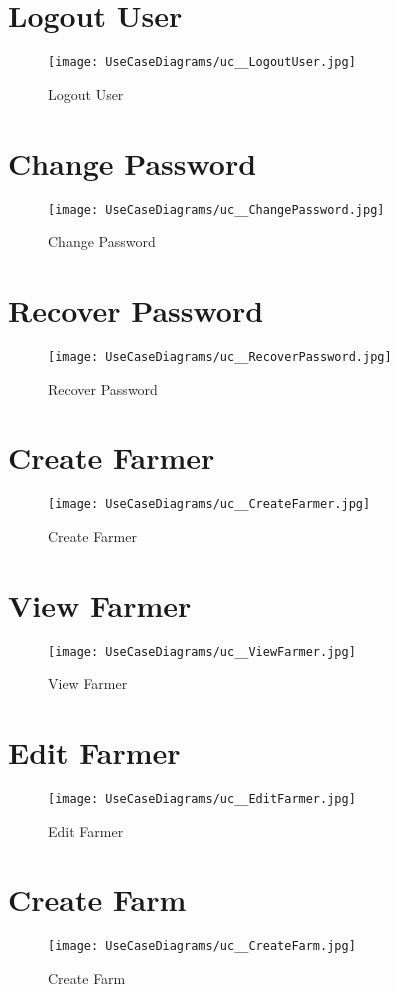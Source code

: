 \documentclass[11pt,fleqn]{book} %
\begin{document}
	\section{Logout User}
	\begin{figure}
		\texttt{[image: UseCaseDiagrams/uc\_\_LogoutUser.jpg]}
		\caption{Logout User}
	\end{figure}
	
	\section{Change Password}
	\begin{figure}
		\texttt{[image: UseCaseDiagrams/uc\_\_ChangePassword.jpg]}
		\caption{Change Password}
	\end{figure}
	
	\section{Recover Password}
	\begin{figure}
		\texttt{[image: UseCaseDiagrams/uc\_\_RecoverPassword.jpg]}
		\caption{Recover Password}
	\end{figure}
	
	\section{Create Farmer}
	\begin{figure}
		\texttt{[image: UseCaseDiagrams/uc\_\_CreateFarmer.jpg]}
		\caption{Create Farmer}
	\end{figure}
	
	\section{View Farmer}
	\begin{figure}
		\texttt{[image: UseCaseDiagrams/uc\_\_ViewFarmer.jpg]}
		\caption{View Farmer}
	\end{figure}
	
	\section{Edit Farmer}
	\begin{figure}
		\texttt{[image: UseCaseDiagrams/uc\_\_EditFarmer.jpg]}
		\caption{Edit Farmer}
	\end{figure}
	
	\section{Create Farm}
	\begin{figure}
		\texttt{[image: UseCaseDiagrams/uc\_\_CreateFarm.jpg]}
		\caption{Create Farm}
	\end{figure}
	
\end{document}
